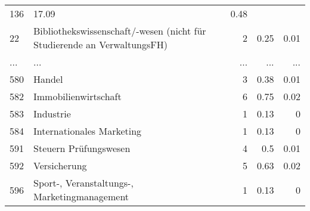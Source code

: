 \begin{longtable}{lXrrr}
          \num{136} &
          \num[round-mode=places,round-precision=2]{17.09} &
          \num[round-mode=places,round-precision=2]{0.48} \\
        22 & \multicolumn{1}{X}{Bibliothekswissenschaft/-wesen (nicht für Studierende an VerwaltungsFH)} & %
          \num{2} &
          \num[round-mode=places,round-precision=2]{0.25} &
          \num[round-mode=places,round-precision=2]{0.01} \\
       ... & ... & ... & ... & ... \\
        580 & \multicolumn{1}{X}{Handel} & %
          \num{3} &
          \num[round-mode=places,round-precision=2]{0.38} &
          \num[round-mode=places,round-precision=2]{0.01} \\

        582 & \multicolumn{1}{X}{Immobilienwirtschaft} & %
          \num{6} &
          \num[round-mode=places,round-precision=2]{0.75} &
          \num[round-mode=places,round-precision=2]{0.02} \\

        583 & \multicolumn{1}{X}{Industrie} & %
          \num{1} &
          \num[round-mode=places,round-precision=2]{0.13} &
          \num[round-mode=places,round-precision=2]{0} \\

        584 & \multicolumn{1}{X}{Internationales Marketing} & %
          \num{1} &
          \num[round-mode=places,round-precision=2]{0.13} &
          \num[round-mode=places,round-precision=2]{0} \\

        591 & \multicolumn{1}{X}{Steuern Prüfungswesen} & %
          \num{4} &
          \num[round-mode=places,round-precision=2]{0.5} &
          \num[round-mode=places,round-precision=2]{0.01} \\

        592 & \multicolumn{1}{X}{Versicherung} & %
          \num{5} &
          \num[round-mode=places,round-precision=2]{0.63} &
          \num[round-mode=places,round-precision=2]{0.02} \\

        596 & \multicolumn{1}{X}{Sport-, Veranstaltungs-, Marketingmanagement} & %
          \num{1} &
          \num[round-mode=places,round-precision=2]{0.13} &
          \num[round-mode=places,round-precision=2]{0} \\


\end{longtable}

